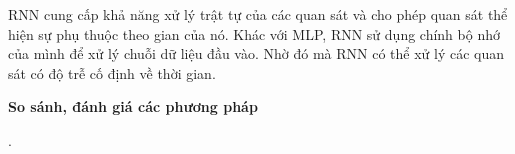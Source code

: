 \bigskip
RNN cung cấp khả năng xử lý trật tự của các quan sát và cho phép quan sát thể hiện sự phụ thuộc theo gian của nó. Khác với MLP, RNN sử dụng chính bộ nhớ của mình để xử lý chuỗi dữ liệu đầu vào. Nhờ đó mà RNN có thể xử lý các quan sát có độ trễ cố định về thời gian. 

\vspace{0.25cm}
\changefontsizes{14pt}
\setlength{\parindent}{0cm}
\textbf{So sánh, đánh giá các phương pháp}

\changefontsizes{13pt}



\newpage
.